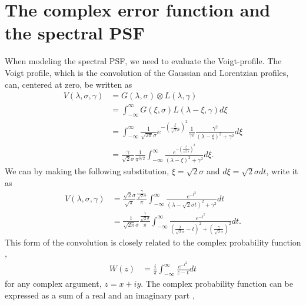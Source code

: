 \documentclass[longauth]{aa}    %
\begin{document}
\section{The complex error function and the spectral PSF} \label{voigt}
When modeling the spectral PSF, we need to evaluate the Voigt-profile. The Voigt profile, which is the convolution of the Gaussian and Lorentzian profiles, can, centered at zero, be written as \citep{pagnini2010} 
\begin{equation} 
\begin{split}
V(\lambda,\sigma, \gamma)  
& = G(\lambda, \sigma)  \otimes L(\lambda, \gamma) \\
& = \int_{-\infty}^{\infty} G(\xi, \sigma) L(\lambda - \xi, \gamma) d\xi \\
& = \int_{-\infty}^{\infty} \frac{1}{\sqrt{2 \pi} \sigma} e^{- \left( \frac{\xi}{\sqrt{2} \sigma}  \right)^2 } \frac{1}{\gamma \pi} \frac{\gamma^2}{(\lambda - \xi)^2 + \gamma^2} d\xi \\
& = \frac{\gamma}{\sqrt{2} \sigma} \frac{1}{ \pi^{3/2}}   \int_{-\infty}^{\infty} \frac{e^{- \left( \frac{\xi}{\sqrt{2} \sigma}  \right)^2 }}{(\lambda - \xi)^2 + \gamma^2} d\xi.
\end{split}
\end{equation}
We can by making the following substitution, $\xi = \sqrt{2} \sigma$ and $d\xi = \sqrt{2} \sigma dt$, write it as
\begin{equation} 
\begin{split}
V(\lambda,\sigma, \gamma)  
& =  \frac{\sqrt{2} \sigma}{ \sqrt{{\pi}}} \frac{\frac{\gamma}{\sqrt{2} \sigma}}{\pi}  \int_{-\infty}^{\infty} \frac{e^{- t^2 }}{(\lambda - \sqrt{2} \sigma t)^2 + \gamma^2} dt \\
& = \frac{1}{\sqrt{2 \pi} \sigma}  \frac{\frac{\gamma}{\sqrt{2} \sigma}}{\pi}  \int_{-\infty}^{\infty} \frac{e^{- t^2 }}{\left(\frac{\lambda}{\sqrt{2} \sigma} -  t\right)^2 + \left(\frac{\gamma}{\sqrt{2} \sigma}\right)^2} dt.	
\end{split}
\end{equation}
This form of the convolution is closely related to the complex probability function \citep{letchworth2007, abrarov2015a},
\begin{equation} 
\begin{split}
W(z)  
& = \frac{i}{\pi} \int_{-\infty}^{\infty} \frac{e^{-t^2}}{z - t}  dt
\end{split}
\end{equation}
for any complex argument, $z = x + iy$. The complex probability function can be expressed as a sum of a real and an imaginary part \citep{benner1995, abrarov2015b},
\end{document}
